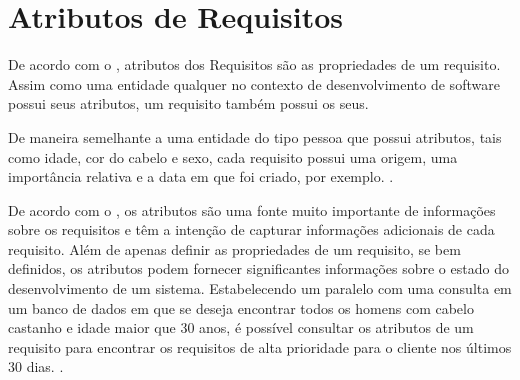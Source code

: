 \section[Atributos de Requisitos]{Atributos de Requisitos}

De acordo com o , atributos dos Requisitos são as propriedades de um requisito. Assim como uma entidade qualquer no contexto de desenvolvimento de software possui seus atributos, um requisito também possui os seus. 

De maneira semelhante a uma entidade do tipo pessoa que possui atributos, tais como idade, cor do cabelo e sexo, cada requisito possui uma origem, uma importância relativa e a data em que foi criado, por exemplo. \cite{openUpBasic}.

De acordo com o , os atributos são uma fonte muito importante de informações sobre os requisitos e têm a intenção de capturar informações adicionais de cada requisito. Além de apenas definir as propriedades de um requisito, se bem definidos, os atributos podem fornecer significantes informações sobre o estado do desenvolvimento de um sistema. Estabelecendo um paralelo com uma consulta em um banco de dados em que se deseja encontrar todos os homens com cabelo castanho e idade maior que 30 anos, é possível consultar os 
atributos de um requisito para encontrar os requisitos de alta prioridade para o cliente nos últimos 30 dias. 
\cite{openUpBasic}.

